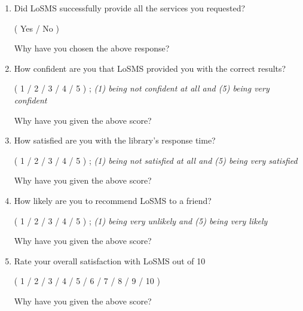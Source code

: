 \documentclass[12pt, titlepage]{article}
\newcommand{\famname}{LoSMS} %
\begin{document}
\begin{enumerate}
	\item Did \famname{} successfully provide all the services you requested?
	
	(	Yes	/	No	)
	
	Why have you chosen the above response?
	
	\item How confident are you that \famname{} provided you with the correct 
	results?
	
	(	1	/	2	/	3	/	4	/	5	) ; \textit{(1) being not confident 
	at all and (5) being very confident}

	Why have you given the above score?

	\item How satisfied are you with the library's response time?  
	
	(	1	/	2	/	3	/	4	/	5	) ; \textit{(1) being not satisfied 
	at all and (5) being very satisfied}

	Why have you given the above score?

	\item How likely are you to recommend \famname{} to a friend?
	
	(	1	/	2	/	3	/	4	/	5	) ; \textit{(1) being very unlikely 
	and (5) being very likely}

	Why have you given the above score?

	\item Rate your overall satisfaction with \famname{} out of 10 
	
	(	1	/	2	/	3	/	4	/	5	/	6	/	7	/	8	/	9	/	
	10	)
	
	Why have you given the above score?
\end {enumerate}
\end{document}
